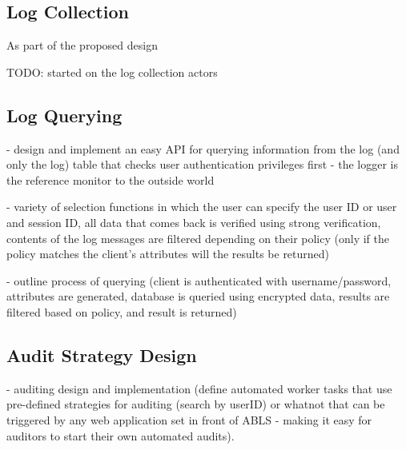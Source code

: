\documentclass{sig-alternate}
\begin{document}
\subsection{Log Collection}
As part of the proposed design 

TODO: started on the log collection actors

\subsection{Log Querying}
- design and implement an easy API for querying information from the log (and only the log) table that checks user authentication privileges first - the logger is the reference monitor to the outside world

- variety of selection functions in which the user can specify the user ID or user and session ID, all data that comes back
is verified using strong verification, contents of the log messages are filtered depending on their policy (only if the policy matches the client's attributes will the results be returned)

- outline process of querying (client is authenticated with username/password, attributes are generated, database is queried using encrypted data, results are filtered based on policy, and result is returned)

\subsection{Audit Strategy Design}
- auditing design and implementation (define automated worker tasks that use pre-defined strategies for
auditing (search by userID) or whatnot that can be triggered by any web application set in front of ABLS - 
making it easy for auditors to start their own automated audits). 

\balance
\end{document}

